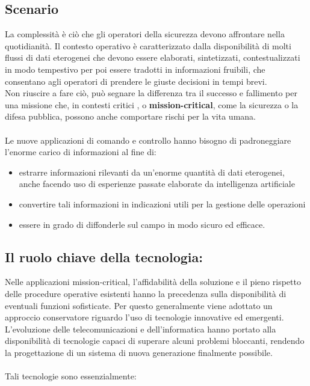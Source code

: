 \subsection{Scenario}
La complessità è ciò che gli operatori della sicurezza devono affrontare nella quotidianità.
Il contesto operativo è caratterizzato dalla disponibilità di
molti flussi di dati eterogenei che devono essere elaborati,
sintetizzati, contestualizzati in modo tempestivo per poi essere
tradotti in informazioni fruibili, che consentano agli operatori di
prendere le giuste decisioni in tempi brevi.\\
Non riuscire a fare ciò, può segnare la differenza tra il successo
e fallimento per una missione che, in contesti critici , o \textbf{mission-critical}, come
la sicurezza o la difesa pubblica, possono anche comportare rischi per la vita umana.
\\\\
Le nuove applicazioni di comando e controllo hanno bisogno di padroneggiare l'enorme carico di informazioni
al fine di:
\begin{itemize}
    \item estrarre informazioni rilevanti da un'enorme quantità di
    dati eterogenei, anche facendo uso di esperienze passate elaborate da intelligenza artificiale
    \item convertire tali informazioni in indicazioni utili per la gestione delle operazioni
    \item essere in grado di diffonderle sul campo in modo sicuro ed efficace.
\end{itemize}

\subsection{Il ruolo chiave della tecnologia:}
Nelle applicazioni mission-critical, l'affidabilità
della soluzione e il pieno rispetto delle 
procedure operative esistenti hanno la precedenza
sulla disponibilità di eventuali funzioni sofisticate. 
Per questo generalmente viene adottato un approccio conservatore
 riguardo l'uso di tecnologie innovative ed emergenti.
\\
L'evoluzione delle telecomunicazioni e dell'informatica 
hanno portato alla disponibilità di tecnologie capaci
di superare alcuni problemi bloccanti, rendendo la
progettazione di un sistema di nuova generazione finalmente possibile.
\\\\
Tali tecnologie sono essenzialmente:

